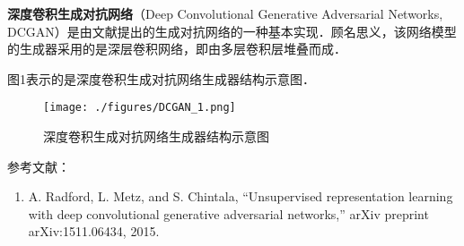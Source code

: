 
\textbf{深度卷积生成对抗网络}（Deep Convolutional Generative Adversarial Networks, DCGAN）是由文献\cite{DCGAN}提出的生成对抗网络的一种基本实现．顾名思义，该网络模型的生成器采用的是深层卷积网络，即由多层卷积层堆叠而成．

图1表示的是深度卷积生成对抗网络生成器结构示意图．
\begin{figure}[ht]
\centering
\texttt{[image: ./figures/DCGAN\_1.png]}
\caption{深度卷积生成对抗网络生成器结构示意图 \cite{DCGAN}} \label{DCGAN_fig1}
\end{figure}







参考文献：
\begin{enumerate}
\item A. Radford, L. Metz, and S. Chintala, “Unsupervised representation learning with deep convolutional generative adversarial networks,” arXiv preprint arXiv:1511.06434, 2015.
\end{enumerate}